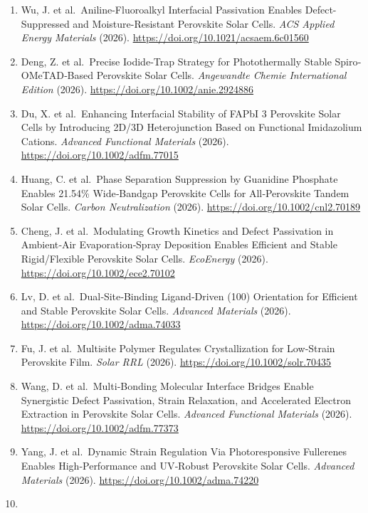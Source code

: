 \documentclass[
  11pt,
]{article}
\begin{document}
\begin{enumerate}
  Air‐Processed Perovskite Solar Cells. \emph{Advanced Materials}
  (2026). \url{https://doi.org/10.1002/adma.74243}
\item
  Wu, J. et al.~Aniline-Fluoroalkyl Interfacial Passivation Enables
  Defect-Suppressed and Moisture-Resistant Perovskite Solar Cells.
  \emph{ACS Applied Energy Materials} (2026).
  \url{https://doi.org/10.1021/acsaem.6c01560}
\item
  Deng, Z. et al.~Precise Iodide‐Trap Strategy for Photothermally Stable
  Spiro‐OMeTAD‐Based Perovskite Solar Cells. \emph{Angewandte Chemie
  International Edition} (2026).
  \url{https://doi.org/10.1002/anie.2924886}
\item
  Du, X. et al.~Enhancing Interfacial Stability of FAPbI 3 Perovskite
  Solar Cells by Introducing 2D/3D Heterojunction Based on Functional
  Imidazolium Cations. \emph{Advanced Functional Materials} (2026).
  \url{https://doi.org/10.1002/adfm.77015}
\item
  Huang, C. et al.~Phase Separation Suppression by Guanidine Phosphate
  Enables 21.54\% Wide‐Bandgap Perovskite Cells for All‐Perovskite
  Tandem Solar Cells. \emph{Carbon Neutralization} (2026).
  \url{https://doi.org/10.1002/cnl2.70189}
\item
  Cheng, J. et al.~Modulating Growth Kinetics and Defect Passivation in
  Ambient‐Air Evaporation‐Spray Deposition Enables Efficient and Stable
  Rigid/Flexible Perovskite Solar Cells. \emph{EcoEnergy} (2026).
  \url{https://doi.org/10.1002/ece2.70102}
\item
  Lv, D. et al.~Dual‐Site‐Binding Ligand‐Driven (100) Orientation for
  Efficient and Stable Perovskite Solar Cells. \emph{Advanced Materials}
  (2026). \url{https://doi.org/10.1002/adma.74033}
\item
  Fu, J. et al.~Multisite Polymer Regulates Crystallization for
  Low‐Strain Perovskite Film. \emph{Solar RRL} (2026).
  \url{https://doi.org/10.1002/solr.70435}
\item
  Wang, D. et al.~Multi‐Bonding Molecular Interface Bridges Enable
  Synergistic Defect Passivation, Strain Relaxation, and Accelerated
  Electron Extraction in Perovskite Solar Cells. \emph{Advanced
  Functional Materials} (2026). \url{https://doi.org/10.1002/adfm.77373}
\item
  Yang, J. et al.~Dynamic Strain Regulation Via Photoresponsive
  Fullerenes Enables High‐Performance and UV‐Robust Perovskite Solar
  Cells. \emph{Advanced Materials} (2026).
  \url{https://doi.org/10.1002/adma.74220}
\item

\end{enumerate}
\end{document}
